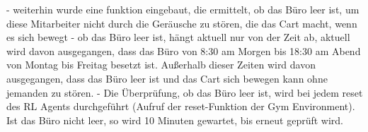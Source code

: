 - weiterhin wurde eine funktion eingebaut, die ermittelt, ob das Büro leer ist, um diese Mitarbeiter nicht durch die Geräusche zu stören, die das Cart macht, wenn es sich bewegt
- ob das Büro leer ist, hängt aktuell nur von der Zeit ab, aktuell wird davon ausgegangen, dass das Büro von 8:30 am Morgen bis 18:30 am Abend von Montag bis Freitag besetzt ist. Außerhalb dieser Zeiten wird davon ausgegangen, dass das Büro leer ist und das Cart sich bewegen kann ohne jemanden zu stören.
- Die Überprüfung, ob das Büro leer ist, wird bei jedem reset des RL Agents durchgeführt (Aufruf der reset-Funktion der Gym Environment). Ist das Büro nicht leer, so wird 10 Minuten gewartet, bis erneut geprüft wird.
